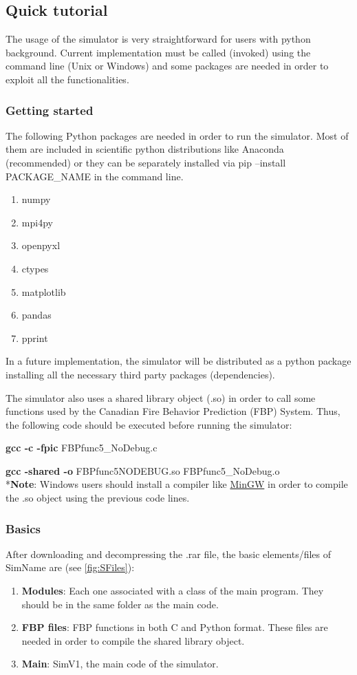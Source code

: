 \documentclass[11pt]{article}
\begin{document}
\newpage

\subsection{Quick tutorial}
The usage of the simulator is very straightforward for users with python background. Current implementation must be called (invoked) using the command line (Unix or Windows) and some packages are needed in order to exploit all the functionalities.
\subsubsection{Getting started}
The following Python packages are needed in order to run the simulator. Most of them are included in scientific python distributions like Anaconda (recommended) or they can be separately installed via pip --install PACKAGE\_NAME in the command line. 
\begin{enumerate}
	\item numpy
	\item mpi4py
	\item openpyxl
	\item ctypes
	\item matplotlib
	\item pandas
	\item pprint
\end{enumerate}
In a future implementation, the simulator will be distributed as a python package installing all the necessary third party packages (dependencies).

The simulator also uses a shared library object (.so) in order to call some functions used by the Canadian Fire Behavior Prediction (FBP) System. Thus, the following code should be executed before running the simulator:

\textbf{gcc -c -fpic} FBPfunc5\_NoDebug.c 

\textbf{gcc -shared -o} FBPfunc5NODEBUG.so FBPfunc5\_NoDebug.o\\

*\textbf{Note}: Windows users should install a compiler like \href{http://www.mingw.org/}{MinGW} in order to compile the .so object using the previous code lines.
\subsubsection{Basics}
After downloading and decompressing the .rar file, the basic elements/files of SimName are (see \ref{fig:SFiles}):
\begin{enumerate}
	\item \textbf{Modules}: Each one associated with a class of the main program. They should be in the same folder as the main code.
	
	\item \textbf{FBP files}: FBP functions in both C and Python format. These files are needed in order to compile the shared library object.
	
	\item \textbf{Main}: SimV1, the main code of the simulator. 
\end{enumerate}
\end{document}
